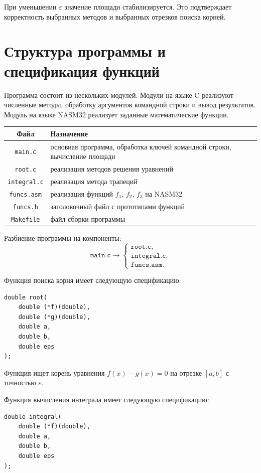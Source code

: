 \documentclass[a4paper,12pt,titlepage,final]{article}
\begin{document}
При уменьшении $\varepsilon$ значение площади стабилизируется. Это подтверждает корректность выбранных методов и выбранных отрезков поиска корней.

\newpage

\section{Структура программы и спецификация функций}

Программа состоит из нескольких модулей. Модули на языке C реализуют численные методы, обработку аргументов командной строки и вывод результатов. Модуль на языке NASM32 реализует заданные математические функции.

\begin{center}
\begin{tabular}{|c|p{10cm}|}
\hline
Файл & Назначение \\
\hline
\texttt{main.c} & основная программа, обработка ключей командной строки, вычисление площади \\
\hline
\texttt{root.c} & реализация методов решения уравнений \\
\hline
\texttt{integral.c} & реализация метода трапеций \\
\hline
\texttt{funcs.asm} & реализация функций $f_1$, $f_2$, $f_3$ на NASM32 \\
\hline
\texttt{funcs.h} & заголовочный файл с прототипами функций \\
\hline
\texttt{Makefile} & файл сборки программы \\
\hline
\end{tabular}
\end{center}

Разбиение программы на компоненты:
\[
\texttt{main.c}
\rightarrow
\begin{cases}
\texttt{root.c},\\
\texttt{integral.c},\\
\texttt{funcs.asm}.
\end{cases}
\]

Функция поиска корня имеет следующую спецификацию:
\begin{verbatim}
double root(
    double (*f)(double),
    double (*g)(double),
    double a,
    double b,
    double eps
);
\end{verbatim}

Функция ищет корень уравнения $f(x)-g(x)=0$ на отрезке $[a,b]$ с точностью $\varepsilon$.

Функция вычисления интеграла имеет следующую спецификацию:
\begin{verbatim}
double integral(
    double (*f)(double),
    double a,
    double b,
    double eps
);
\end{verbatim}
\end{document}
